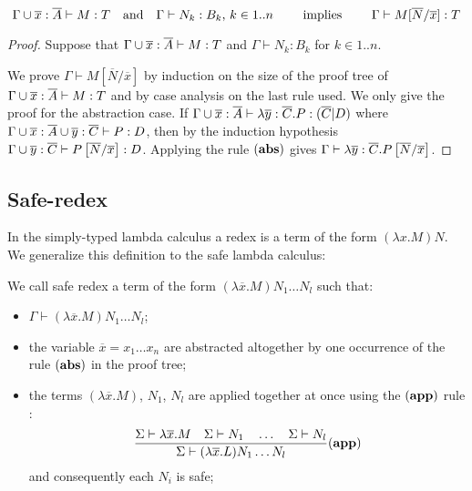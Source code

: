 \begin{lem}
\label{lem:subst_preserve_i}
$$ \Gamma\cup \overline{x} : \overline{A}\vdash M : T
\quad \mbox{and} \quad \Gamma \vdash N_k : B_k \mbox{, } k \in
1..n \qquad \mbox{ implies } \qquad \Gamma \vdash
M[\overline{N}/\overline{x}] : T$$
\end{lem}

\begin{proof}
Suppose that $\Gamma \cup \overline{x}: \overline{A} \vdash M :T$ and
$\Gamma \vdash N_k : B_k$ for $k \in 1..n$.

We prove $\Gamma \vdash M[\overline{N}/\overline{x}]$ by induction
on the size of the proof tree of $\Gamma\cup
\overline{x}:\overline{A} \vdash M : T$ and by case analysis on the
last rule used. We only give the proof for the abstraction case. If
$\Gamma \cup \overline{x}:\overline{A} \vdash \lambda \overline{y}
: \overline{C}. P : (\overline{C}|D)$ where $\Gamma\cup
\overline{x}:\overline{A}\cup \overline{y}:\overline{C} \vdash P :
D$, then by the induction hypothesis $\Gamma\cup
\overline{y}:\overline{C} \vdash P\left[ \overline{N}/\overline{x} \right]
: D$. Applying the rule $\mathbf{(abs)}$ gives $\Gamma \vdash
\lambda \overline{y}:\overline{C} . P
\left[ \overline{N}/\overline{x} \right]$.
\end{proof}

\subsection{Safe-redex}
In the simply-typed lambda calculus a redex is a term of the form
$(\lambda x . M) N$. We generalize this definition to the safe
lambda calculus:
\begin{dfn}
We call safe redex a term of the form $(\lambda \overline{x} . M)
N_1 \ldots N_l$ such that:
\begin{itemize}
\item $ \Gamma \vdash (\lambda \overline{x} . M) N_1 \ldots N_l $;
\item the variable $\overline{x}=x_1\ldots x_n$ are abstracted altogether by one occurrence of the rule $\mathbf{(abs)}$ in the proof
tree;
\item the terms $(\lambda \overline{x} . M)$, $N_1$, $N_l$ are applied together at once using the $\mathbf{(app)}$ rule :
$$   \frac{\displaystyle 
            \Sigma \vdash \lambda \overline{x} . M
            \quad
            \Sigma \vdash N_1         \quad \ldots \quad \Sigma \vdash N_l
    }{
       \Sigma \vdash (\lambda \overline{x} . L) N_1 \ldots N_l
    } (\mathbf{app})
$$
and consequently each $N_i$ is safe;
\end{itemize}
\end{dfn}

